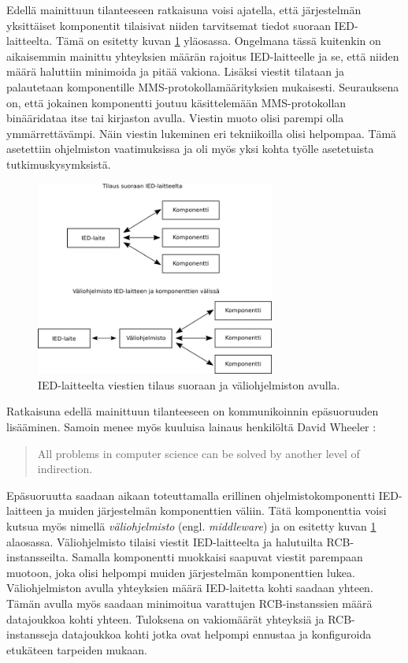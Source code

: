 Edellä mainittuun tilanteeseen ratkaisuna voisi ajatella, että järjestelmän yksittäiset komponentit tilaisivat niiden tarvitsemat tiedot suoraan IED-laitteelta. Tämä on esitetty kuvan \ref{fig:architecture-analysis} yläosassa. Ongelmana tässä kuitenkin on aikaisemmin mainittu yhteyksien määrän rajoitus IED-laitteelle ja se, että niiden määrä haluttiin minimoida ja pitää vakiona. Lisäksi viestit tilataan ja palautetaan komponentille MMS-protokollamäärityksien mukaisesti. Seurauksena on, että jokainen komponentti joutuu käsittelemään MMS-protokollan binääridataa itse tai kirjaston avulla. Viestin muoto olisi parempi olla ymmärrettävämpi. Näin viestin lukeminen eri tekniikoilla olisi helpompaa. Tämä asetettiin ohjelmiston vaatimuksissa ja oli myös yksi kohta työlle asetetuista tutkimuskysymksistä.

\begin{figure}[ht!]
	\includegraphics[width=0.7\textwidth]{pictures/architecture-analysis.png}
	\caption{IED-laitteelta viestien tilaus suoraan ja väliohjelmiston avulla.}
	\label{fig:architecture-analysis}
\end{figure}

Ratkaisuna edellä mainittuun tilanteeseen on kommunikoinnin epäsuoruuden lisääminen. Samoin menee myös kuuluisa lainaus henkilöltä David Wheeler \cite[s.~290]{beautiful-code}:
\begin{quote}
	All problems in computer science can be solved by another level of indirection.
\end{quote}
Epäsuoruutta saadaan aikaan toteuttamalla erillinen ohjelmistokomponentti IED-laitteen ja muiden järjestelmän komponenttien väliin. Tätä komponenttia voisi kutsua myös nimellä \emph{väliohjelmisto} (engl. \emph{middleware}) ja on esitetty kuvan \ref{fig:architecture-analysis} alaosassa. Väliohjelmisto tilaisi viestit IED-laitteelta ja halutuilta RCB-instansseilta. Samalla komponentti muokkaisi saapuvat viestit parempaan muotoon, joka olisi helpompi muiden järjestelmän komponenttien lukea. Väliohjelmiston avulla yhteyksien määrä IED-laitetta kohti saadaan yhteen. Tämän avulla myös saadaan minimoitua varattujen RCB-instanssien määrä datajoukkoa kohti yhteen. Tuloksena on vakiomäärät yhteyksiä ja RCB-instansseja datajoukkoa kohti jotka ovat helpompi ennustaa ja konfiguroida etukäteen tarpeiden mukaan.

